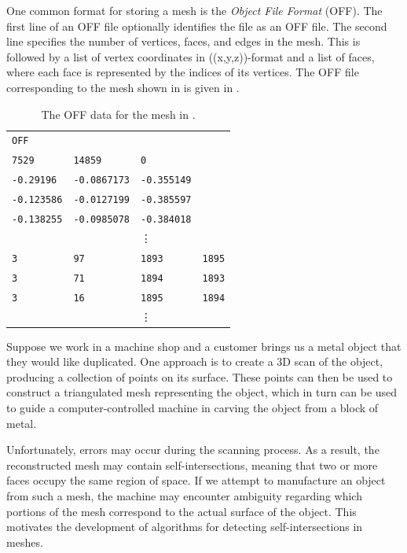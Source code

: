 One common format for storing a mesh is the \emph{Object File Format} (OFF). The first line of an OFF file optionally identifies the file as an OFF file. The second line specifies the number of vertices, faces, and edges in the mesh. This is followed by a list of vertex coordinates in ((x,y,z))-format and a list of faces, where each face is represented by the indices of its vertices.
The OFF file corresponding to the mesh shown in  is given in .
\small
\begin{table}[h!]
\caption{The OFF data for the mesh in .}
\centering
\begin{tabular}{|p{2cm} p{2cm} p{2cm} p{2cm}|} 
 \hline
\texttt{OFF} &  & &  \\ 
\texttt{7529} & \texttt{14859} & \texttt{0} &  \\ 
\texttt{-0.29196} & \texttt{-0.0867173} & \texttt{-0.355149}  &  \\
 \texttt{-0.123586}   & \texttt{-0.0127199} & \texttt{-0.385597} &  \\
\texttt{-0.138255}   & \texttt{-0.0985078} & \texttt{-0.384018} &  \\
  & &\vdots &  \\  
 \texttt{3}&  \texttt{97} &\texttt{1893}& \texttt{1895}\\
 \texttt{3}& \texttt{71} & \texttt{1894} & \texttt{1893} \\
 \texttt{3} & \texttt{16} & \texttt{1895} & \texttt{1894}\\
   & &\vdots &  \\  
 \hline
\end{tabular}

\label{tab:off}
\end{table}
\normalsize
Suppose we work in a machine shop and a customer brings us a metal object that they would like duplicated. One approach is to create a 3D scan of the object, producing a collection of points on its surface. These points can then be used to construct a triangulated mesh representing the object, which in turn can be used to guide a computer-controlled machine in carving the object from a block of metal.

Unfortunately, errors may occur during the scanning process. As a result, the reconstructed mesh may contain self-intersections, meaning that two or more faces occupy the same region of space. If we attempt to manufacture an object from such a mesh, the machine may encounter ambiguity regarding which portions of the mesh correspond to the actual surface of the object. This motivates the development of algorithms for detecting self-intersections in meshes.

